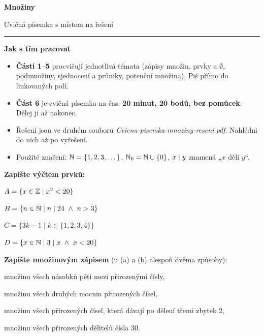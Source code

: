 \documentclass[11pt,a4paper]{article}
\begin{document}
{\sffamily\bfseries\fontsize{25}{28}\selectfont\color{accent} Množiny}\par
\vspace{2pt}
{\sffamily\large\color{muted} Cvičná písemka s místem na řešení}\par
\vspace{10pt}
{\color{rulegray}\rule{\linewidth}{0.6pt}}\par
\vspace{10pt}

\begin{tip}
{\sffamily\bfseries\small Jak s tím pracovat}\par\vspace{3pt}
\begin{itemize}[leftmargin=1.2em,itemsep=2pt]
  \item \textbf{Části 1–5} procvičují jednotlivá témata (zápisy množin, prvky a $\emptyset$, podmnožiny, sjednocení a průniky, potenční množina). Piš přímo do linkovaných polí.
  \item \textbf{Část 6} je cvičná písemka na čas: \textbf{20 minut, 20 bodů, bez pomůcek}. Dělej ji až nakonec.
  \item Řešení jsou ve druhém souboru \textit{Cvicna-pisemka-mnoziny-reseni.pdf}. Nahlédni do nich až po vyřešení.
  \item Použité značení: $\mathbb N=\{1,2,3,\dots\}$, $\mathbb N_0=\mathbb N\cup\{0\}$, $x\mathrel{\mid} y$ znamená „$x$ dělí $y$“.
\end{itemize}
\end{tip}


\Needspace*{7.6cm}
\textbf{Zapište výčtem prvků:}
\begin{pol}
  \item $A=\{x\in\mathbb Z\mid x^2<20\}$
  \item $B=\{n\in\N\mid n\pr 24\ \land\ n>3\}$
  \item $C=\{3k-1\mid k\in\{1,2,3,4\}\}$
  \item $D=\{x\in\N\mid 3\pr x\ \land\ x<20\}$
\end{pol}
\misto{4.2cm}

\Needspace*{9.7cm}
\textbf{Zapište množinovým zápisem} (u (a) a (b) alespoň dvěma způsoby):
\begin{pol}
  \item množinu všech násobků pěti mezi přirozenými čísly,
  \item množinu všech druhých mocnin přirozených čísel,
  \item množinu všech přirozených čísel, která dávají po dělení třemi zbytek 2,
  \item množinu všech přirozených dělitelů čísla 30.
\end{pol}
\misto{6.3cm}
\end{document}
